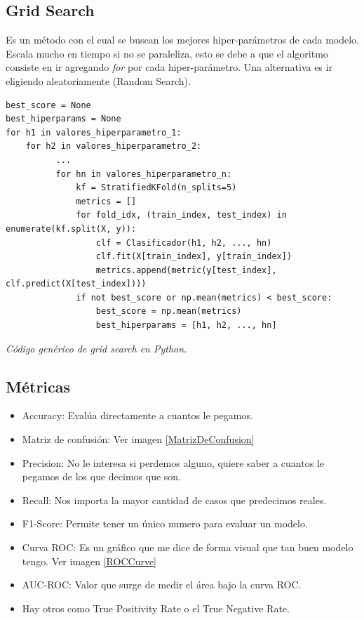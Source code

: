 \documentclass[titlepage,a4paper]{article}
\begin{document}
\subsection{Grid Search}

Es un método con el cual se buscan los mejores hiper-parámetros de cada modelo. Escala mucho en tiempo si no se paraleliza, esto se debe a que el algoritmo consiste en ir agregando \textit{for} por cada hiper-parámetro. Una alternativa es ir eligiendo aleatoriamente (Random Search).

\begin{verbatim}
best_score = None
best_hiperparams = None
for h1 in valores_hiperparametro_1:
    for h2 in valores_hiperparametro_2:
          ...
          for hn in valores_hiperparametro_n:
              kf = StratifiedKFold(n_splits=5)
              metrics = []
              for fold_idx, (train_index, test_index) in enumerate(kf.split(X, y)):
                  clf = Clasificador(h1, h2, ..., hn)
                  clf.fit(X[train_index], y[train_index])
                  metrics.append(metric(y[test_index], clf.predict(X[test_index])))
              if not best_score or np.mean(metrics) < best_score:
                  best_score = np.mean(metrics)
                  best_hiperparams = [h1, h2, ..., hn]
\end{verbatim}
\begin{center}
   \textit{Código genérico de grid search en Python.}
\end{center}





\subsection{Métricas}
\begin{itemize}
    \item Accuracy: Evalúa directamente a cuantos le pegamos.
    \item Matriz de confusión: Ver imagen \ref{MatrizDeConfusion}
    \item Precision: No le interesa si perdemos alguno, quiere saber a cuantos le pegamos de los que decimos que son. 
    \item Recall: Nos importa la mayor cantidad de casos que predecimos reales.
    \item F1-Score: Permite tener un único numero para evaluar un modelo.
    \item Curva ROC: Es un gráfico que me dice de forma visual que tan buen modelo tengo. Ver imagen \ref{ROCCurve}
    \item AUC-ROC: Valor que surge de medir el área bajo la curva ROC.
    \item Hay otros como True Positivity Rate o el True Negative Rate.
\end{itemize}
\end{document}
